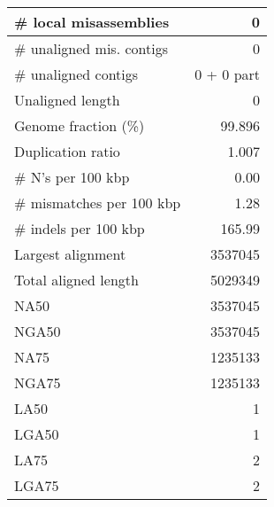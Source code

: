 \documentclass[12pt,a4paper]{article}
\begin{document}
\begin{table}[ht]
\begin{center}
\begin{tabular}{|l*{1}{|r}|}
\# local misassemblies & 0 \\ \hline
\# unaligned mis. contigs & 0 \\ \hline
\# unaligned contigs & 0 + 0 part \\ \hline
Unaligned length & 0 \\ \hline
Genome fraction (\%) & 99.896 \\ \hline
Duplication ratio & 1.007 \\ \hline
\# N's per 100 kbp & 0.00 \\ \hline
\# mismatches per 100 kbp & 1.28 \\ \hline
\# indels per 100 kbp & 165.99 \\ \hline
Largest alignment & 3537045 \\ \hline
Total aligned length & 5029349 \\ \hline
NA50 & 3537045 \\ \hline
NGA50 & 3537045 \\ \hline
NA75 & 1235133 \\ \hline
NGA75 & 1235133 \\ \hline
LA50 & 1 \\ \hline
LGA50 & 1 \\ \hline
LA75 & 2 \\ \hline
LGA75 & 2 \\ \hline
\end{tabular}
\end{center}
\end{table}
\end{document}
